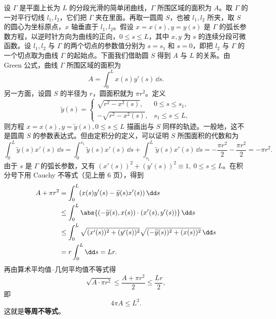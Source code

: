 设 $\Gamma$ 是平面上长为 $L$ 的分段光滑的简单闭曲线，$\Gamma$ 所围区域的面积为 $A$。取 $\Gamma$ 的一对平行切线 $l_1,l_2$，它们把 $\Gamma$ 夹在里面。再取一圆周 $S$，也被 $l_1,l_2$ 所夹，取 $S$ 的圆心为坐标原点，$x$ 轴垂直于 $l_1,l_2$。假设 $x=x(s),y=y(s)$ 是 $\Gamma$ 的弧长参数方程，以逆时针方向为曲线的正向，$0\le s\le L$，其中 $x,y$ 为 $s$ 的连续分段可微函数。设 $l_1,l_2$ 与 $\Gamma$ 的两个切点的参数值分别为 $s=s_1$ 和 $s=0$，即把 $l_2$ 与 $\Gamma$ 的一个切点取为曲线 $\Gamma$ 的起始点。下面我们借助圆 $S$ 得到 $A$ 与 $L$ 的关系。由 Green 公式，曲线 $\Gamma$ 所围区域的面积为
\[
  A=\int_0^Lx(s)y'(s)\,\dd s.
\]
另一方面，设圆 $S$ 的半径为 $r$，圆面积就为 $\pi r^2$。定义
\[
  \widetilde y(s)=
  \begin{cases}
    \sqrt{r^2-x^2(s)},&0\le s\le s_1,\\
    -\sqrt{r^2-x^2(s)},&s_1\le s\le L,
  \end{cases}
\]
则方程 $x=x(s),y=\widetilde y(s),0\le s\le L$ 描画出与 $S$ 同样的轨迹。一般地，这不是圆周 $S$ 的参数表达式。但由定积分的定义，可以证明 $S$ 所围面积的代数和为
\[
  \int_0^L\widetilde y(s)x'(s)\,\dd s
  =\int_0^{s_1}\widetilde y(s)x'(s)\,\dd s+\int_{s_1}^L\widetilde y(s)x'(s)\,\dd s
  =-\frac{\pi r^2}{2}-\frac{\pi r^2}{2}=-\pi r^2.
\]
由于 $s$ 是 $\Gamma$ 的弧长参数，又有 $(x'(s))^2+(y'(s))^2\equiv1,\ 0\le s\le L$。在积分号下用 Cauchy 不等式（见上册 6 页），得到
\begin{align*}
  A+\pi r^2
  &=\int_0^L(x(s)y'(s)-\widetilde y(s)x'(s))\,\dd s\\
  &\le\int_0^L\abs{(-\widetilde y(s),x(s))\cdot(x'(s),y'(s))}\,\dd s\\
  &\le\int_0^L\sqrt{(x'(s))^2+(y'(s))^2}\sqrt{(-\widetilde y(s))^2+(x(s))^2}\,\dd s\\
  &=r\int_0^L\dd s=Lr.
\end{align*}
再由算术平均值--几何平均值不等式得
\[
  \sqrt{A\cdot\pi r^2}\le\frac{A+\pi r^2}{2}\le\frac{Lr}{2},
\]
即
\[
  4\pi A\le L^2.
\]
这就是\textbf{等周不等式}。

